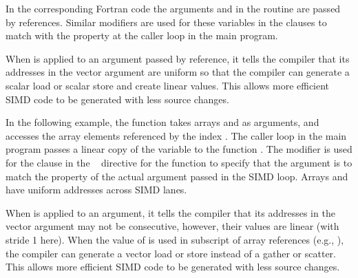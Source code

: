In the corresponding Fortran code the arguments  and
 in the routine  are passed by references. 
Similar modifiers are used for these variables in the  clauses
to match with the property at the caller loop in the main program.

When  is applied to an argument passed by reference, it 
tells the compiler that its addresses in the vector argument are uniform 
so that the compiler can generate a scalar load or scalar store and create 
linear values. This allows more efficient SIMD code to be generated with 
less source changes.


In the following example, the function  takes arrays  and  
as arguments, and accesses the array elements referenced by the index .
The caller loop  in the main program passes a linear copy of
the variable  to the function .
The  modifier is used for the  clause 
in the ~ directive for the function
 to specify that the argument  is to match the property of 
the actual argument  passed in the SIMD loop.
Arrays  and  have uniform addresses across SIMD lanes.

When  is applied to an argument, 
it tells the compiler that its addresses in the vector argument may not be 
consecutive, however, their values are linear (with stride 1 here). When the value of  is used 
in subscript of array references (e.g., ), the compiler can generate 
a vector load or store instead of a gather or scatter. This allows more 
efficient SIMD code to be generated with less source changes.



